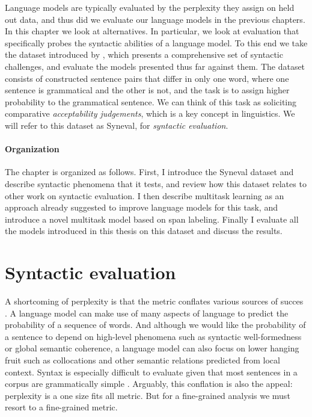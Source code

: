 % 

Language models are typically evaluated by the perplexity they assign on held out data, and thus did we evaluate our language models in the previous chapters. In this chapter we look at alternatives. In particular, we look at evaluation that specifically probes the syntactic abilities of a language model. To this end we take the dataset introduced by \citet{linzen2018targeted}, which presents a comprehensive set of syntactic challenges, and evaluate the models presented thus far against them. The dataset consists of constructed sentence pairs that differ in only one word, where one sentence is grammatical and the other is not, and the task is to assign higher probability to the grammatical sentence. We can think of this task as soliciting comparative \textit{acceptability judgements}, which is a key concept in linguistics. We will refer to this dataset as Syneval, for \textit{syntactic evaluation}.

\paragraph{Organization}
The chapter is organized as follows. First, I introduce the Syneval dataset and describe syntactic phenomena that it tests, and review how this dataset relates to other work on syntactic evaluation. I then describe multitask learning as an approach already suggested to improve language models for this task, and introduce a novel multitask model based on span labeling. Finally I evaluate all the models introduced in this thesis on this dataset and discuss the results.

\section{Syntactic evaluation}
A shortcoming of perplexity is that the metric conflates various sources of succes \citep{linzen2018targeted}. A language model can make use of many aspects of language to predict the probability of a sequence of words. And although we would like the probability of a sentence to depend on high-level phenomena such as syntactic well-formedness or global semantic coherence, a language model can also focus on lower hanging fruit such as collocations and other semantic relations predicted from local context. Syntax is especially difficult to evaluate given that most sentences in a corpus are grammatically simple \citep{linzen2018targeted}. Arguably, this conflation is also the appeal: perplexity is a one size fits all metric. But for a fine-grained analysis we must resort to a fine-grained metric.


